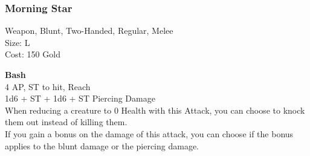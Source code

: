 \subsubsection{Morning Star}\label{weapon:morningStar}
Weapon, Blunt, Two-Handed, Regular, Melee\\
Size: L\\
Cost: 150 Gold

\textbf{Bash}\\
4 AP, ST to hit,  Reach\\
1d6 + \texttimes ST + 1d6 + \texttimes ST Piercing Damage\\
When reducing a creature to 0 Health with this Attack, you can choose to knock them out instead of killing them.\\
If you gain a bonus on the damage of this attack, you can choose if the bonus applies to the blunt damage or the piercing damage.